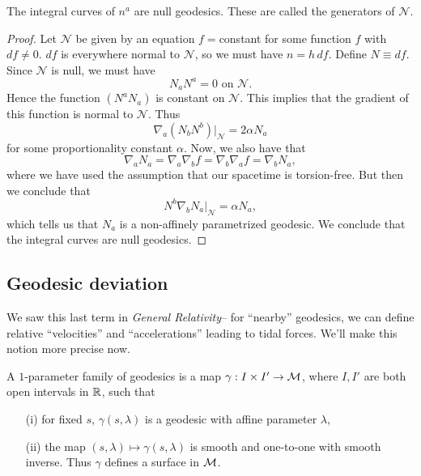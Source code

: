 \begin{prop}
    The integral curves of $n^a$ are null geodesics. These are called the generators of $\mathcal{N}$.
\end{prop}
\begin{proof}
    Let $\mathcal{N}$ be given by an equation $f=$constant for some function $f$ with $df\neq 0$. $df$ is everywhere normal to $\mathcal{N}$, so we must have $n=h \,df$. Define $N\equiv df$. Since $\mathcal{N}$ is null, we must have
    \begin{equation}
        N_a N^a =0\text{ on }\mathcal{N}.
    \end{equation}
    Hence the function $(N^a N_a)$ is constant on $\mathcal{N}$. This implies that the gradient of this function is normal to $\mathcal{N}$. Thus
    \begin{equation}
        \nabla_a(N_b N^b)|_{\mathcal{N}}=2\alpha N_a
    \end{equation}
    for some proportionality constant $\alpha$. Now, we also have that
    \begin{equation*}
        \nabla_a N_a = \nabla_a \nabla_b f = \nabla_b \nabla_a f =\nabla_b N_a,
    \end{equation*}
    where we have used the assumption that our spacetime is torsion-free. But then we conclude that
    \begin{equation}
        N^b \nabla_b N_a|_{\mathcal{N}}=\alpha N_a,
    \end{equation}
    which tells us that $N_a$ is a non-affinely parametrized geodesic. We conclude that the integral curves are null geodesics.
\end{proof}

\subsection*{Geodesic deviation} We saw this last term in \emph{General Relativity}-- for ``nearby'' geodesics, we can define relative ``velocities'' and ``accelerations'' leading to tidal forces. We'll make this notion more precise now.
\begin{defn}
    A $1$-parameter family of geodesics is a map $\gamma:I\times I'\to \mathcal{M}$, where $I,I'$ are both open intervals in $\mathbb{R}$, such that
    \begin{itemize}
        \item[(i)] for fixed $s$, $\gamma(s,\lambda)$ is a geodesic with affine parameter $\lambda$,
        \item[(ii)] the map $(s,\lambda)\mapsto \gamma(s,\lambda)$ is smooth and one-to-one with smooth inverse. Thus $\gamma$ defines a surface in $\mathcal{M}$.
    \end{itemize}
\end{defn}

